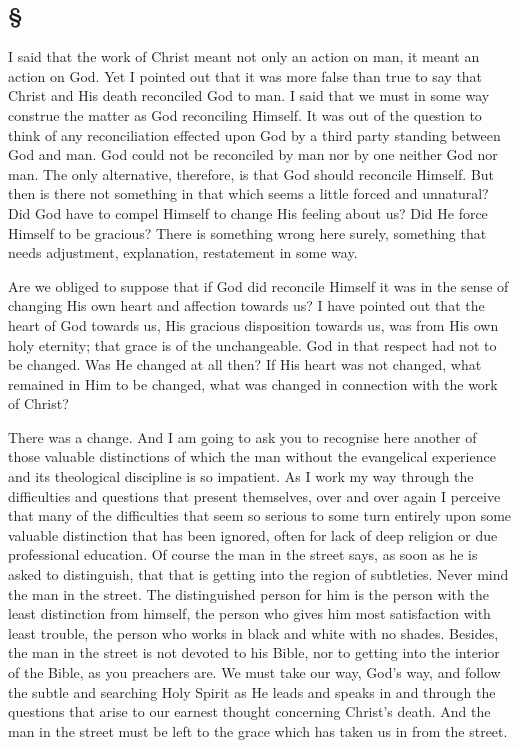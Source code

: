 \documentclass[draft]{ptfdoc}
\begin{document}
\subsection*{
\S
}

I said that the work of Christ meant not only 
an action on man, it meant an action on God. 
Yet I pointed out that it was more false than 
true to say that Christ and His death reconciled 
God to man. I said that we must in some way 
construe the matter as God reconciling Himself. 
It was out of the question to think of any 
reconciliation effected upon God by a third 
party standing between God and man. God 
could not be reconciled by man nor by one 
neither God nor man. The only alternative, 
therefore, is that God should reconcile Himself. 
But then is there not something in that which 
seems a little forced and unnatural? Did God 
have to compel Himself to change His feeling 
about us? Did He force Himself to be gracious? 
There is something wrong here surely, something 
that needs adjustment, explanation, restatement 
in some way. 

Are we obliged to suppose that if God did 
reconcile Himself it was in the sense of changing 
His own heart and affection towards us? I 
have pointed out that the heart of God towards 
us, His gracious disposition towards us, was 
from His own holy eternity; that grace is of the 
unchangeable. God in that respect had not to 
be changed. Was He changed at all then? If 
His heart was not changed, what remained in 
Him to be changed, what was changed in 
connection with the work of Christ? 

There was a change. And I am going to ask 
you to recognise here another of those valuable 
distinctions of which the man without the evangelical 
experience and its theological discipline 
is so impatient. As I work my way through 
the difficulties and questions that present themselves, 
over and over again I perceive that many 
of the difficulties that seem so serious to some 
turn entirely upon some valuable distinction 
that has been ignored, often for lack of deep religion 
or due professional education. Of course 
the man in the street says, as soon as he is 
asked to distinguish, that that is getting into 
the region of subtleties. Never mind the man 
in the street. The distinguished person for him 
is the person with the least distinction from 
himself, the person who gives him most satisfaction 
with least trouble, the person who works 
in black and white with no shades. Besides, the 
man in the street is not devoted to his Bible, nor 
to getting into the interior of the Bible, as you 
preachers are. We must take our way, God's 
way, and follow the subtle and searching Holy 
Spirit as He leads and speaks in and through 
the questions that arise to our earnest thought 
concerning Christ's death. And the man in the 
street must be left to the grace which has taken 
us in from the street. 
\end{document}
